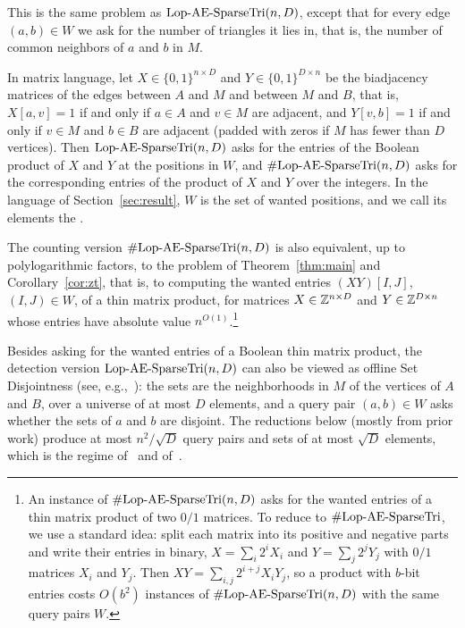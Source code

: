 \begin{definition}\label{def:countlop}
This is the same problem as $\mathrm{Lop}\text{-}\mathrm{AE}\text{-}\mathrm{SparseTri}(n,D)$, except that for every edge $(a,b)\in W$ we ask for the number of triangles it lies in, that is, the number of common neighbors of $a$ and $b$ in $M$.
\end{definition}

In matrix language, let $X\in\{0,1\}^{n\times D}$ and $Y\in\{0,1\}^{D\times n}$ be the biadjacency matrices of the edges between $A$ and $M$ and between $M$ and $B$, that is, $X[a,v]=1$ if and only if $a\in A$ and $v\in M$ are adjacent, and $Y[v,b]=1$ if and only if $v\in M$ and $b\in B$ are adjacent (padded with zeros if $M$ has fewer than $D$ vertices). Then $\mathrm{Lop}\text{-}\mathrm{AE}\text{-}\mathrm{SparseTri}(n,D)$ asks for the entries of the Boolean product of $X$ and $Y$ at the positions in $W$, and $\#\mathrm{Lop}\text{-}\mathrm{AE}\text{-}\mathrm{SparseTri}(n,D)$ asks for the corresponding entries of the product of $X$ and $Y$ over the integers. In the language of Section~\ref{sec:result}, $W$ is the set of wanted positions, and we call its elements the .

The counting version $\#\mathrm{Lop}\text{-}\mathrm{AE}\text{-}\mathrm{SparseTri}(n,D)$ is also equivalent, up to polylogarithmic factors, to the problem of Theorem~\ref{thm:main} and Corollary~\ref{cor:zt}, that is, to computing the wanted entries $(XY)[I,J]$, $(I,J)\in W$, of a thin matrix product, for matrices $X\in\mathbb{Z}^{n\times D}$ and $Y\in\mathbb{Z}^{D\times n}$ whose entries have absolute value $n^{O(1)}$.\footnote{An instance of $\#\mathrm{Lop}\text{-}\mathrm{AE}\text{-}\mathrm{SparseTri}(n,D)$ asks for the wanted entries of a thin matrix product of two $0/1$ matrices. To reduce to $\#\mathrm{Lop}\text{-}\mathrm{AE}\text{-}\mathrm{SparseTri}$, we use a standard idea: split each matrix into its positive and negative parts and write their entries in binary, $X=\sum_i2^iX_i$ and $Y=\sum_j2^jY_j$ with $0/1$ matrices $X_i$ and $Y_j$. Then $XY=\sum_{i,j}2^{i+j}X_iY_j$, so a product with $b$-bit entries costs $O(b^2)$ instances of $\#\mathrm{Lop}\text{-}\mathrm{AE}\text{-}\mathrm{SparseTri}(n,D)$ with the same query pairs $W$.} 

Besides asking for the wanted entries of a Boolean thin matrix product, the detection version $\mathrm{Lop}\text{-}\mathrm{AE}\text{-}\mathrm{SparseTri}(n,D)$ can also be viewed as offline Set Disjointness (see, e.g.,~\cite{KPP16,VX20a}): the sets are the neighborhoods in $M$ of the vertices of $A$ and $B$, over a universe of at most $D$ elements, and a query pair $(a,b)\in W$ asks whether the sets of $a$ and $b$ are disjoint. The reductions below (mostly from prior work) produce at most $n^2/\sqrt D$ query pairs and sets of at most $\sqrt D$ elements, which is the regime of~\cite{KPP16} and of~\cite[Corollary~3.12]{VX20a}.

